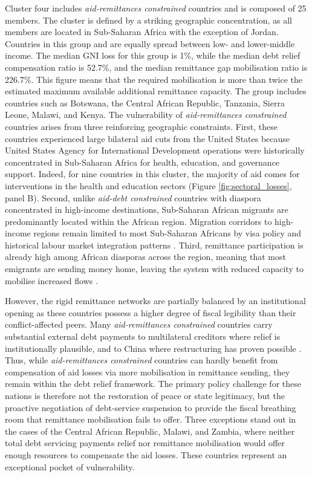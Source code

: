 \documentclass[fleqn,10pt,twocolumn]{wlscirep}
\begin{document}
{%
{
Cluster four includes \textit{aid-remittances constrained} countries and is composed of 25 members. The cluster is defined by a striking geographic concentration, as all members are located in Sub-Saharan Africa with the exception of Jordan. Countries in this group and are equally spread between low- and lower-middle income. The median GNI loss for this group is 1\%, while the median debt relief compensation ratio is 52.7\%, and the median remittance gap mobilisation ratio is 226.7\%. This figure means that the required mobilisation is more than twice the estimated maximum available additional remittance capacity. The group includes countries such as Botswana, the Central African Republic, Tanzania, Sierra Leone, Malawi, and Kenya. The vulnerability of \textit{aid-remittances constrained} countries arises from three reinforcing geographic constraints. First, these countries experienced large bilateral aid cuts from the United States because United States Agency for International Development operations were historically concentrated in Sub-Saharan Africa for health, education, and governance support. Indeed, for nine countries in this cluster, the majority of aid comes for interventions in the health and education sectors (Figure \ref{fig:sectoral_losses}, panel B). Second, unlike \textit{aid-debt constrained} countries with diaspora concentrated in high-income destinations, Sub-Saharan African migrants are predominantly located within the African region. Migration corridors to high-income regions remain limited to most Sub-Saharan Africans by visa policy and historical labour market integration patterns \cite{makina2023patterns}. Third, remittance participation is already high among African diasporas across the region, meaning that most emigrants are sending money home, leaving the system with reduced capacity to mobilise increased flows \cite{vismara2025migrants}.

However, the rigid remittance networks are partially balanced by an institutional opening as these countries possess a higher degree of fiscal legibility than their conflict-affected peers. Many \textit{aid-remittances constrained} countries carry substantial external debt payments to multilateral creditors where relief is institutionally plausible, and to China where restructuring has proven possible \cite{acker2020debt}. Thus, while \textit{aid-remittances constrained} countries can hardly benefit from compensation of aid losses via more mobilisation in remittance sending, they remain within the debt relief framework. The primary policy challenge for these nations is therefore not the restoration of peace or state legitimacy, but the proactive negotiation of debt-service suspension to provide the fiscal breathing room that remittance mobilisation fails to offer. Three exceptions stand out in the cases of the Central African Republic, Malawi, and Zambia, where neither total debt servicing payments relief nor remittance mobilisation would offer enough resources to compensate the aid losses. These countries represent an exceptional pocket of vulnerability. 
}

}
\end{document}
